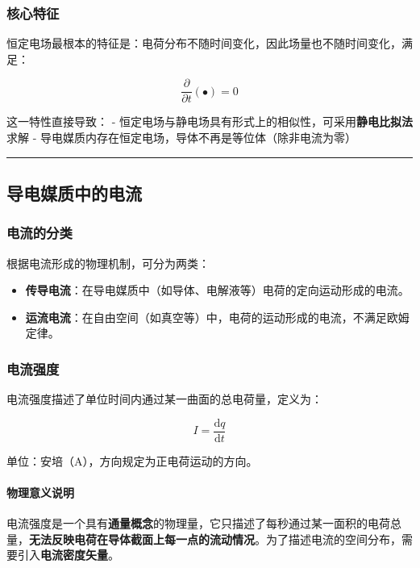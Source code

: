\subsubsection{核心特征}
恒定电场最根本的特征是：电荷分布不随时间变化，因此场量也不随时间变化，满足：
\begin{formulaBox}
\[
\frac{\partial}{\partial t}(\bullet) = 0
\]
\end{formulaBox}

\noindent 这一特性直接导致：
- 恒定电场与静电场具有形式上的相似性，可采用\textbf{静电比拟法}求解
- 导电媒质内存在恒定电场，导体不再是等位体（除非电流为零）

\vspace{0.8cm}\hrule\vspace{0.8cm}

\subsection{导电媒质中的电流}
\subsubsection{电流的分类}
根据电流形成的物理机制，可分为两类：
\begin{itemize}
    \item \textbf{传导电流}：在导电媒质中（如导体、电解液等）电荷的定向运动形成的电流。
    \item \textbf{运流电流}：在自由空间（如真空等）中，电荷的运动形成的电流，不满足欧姆定律。
\end{itemize}

\subsubsection{电流强度}
电流强度描述了单位时间内通过某一曲面的总电荷量，定义为：
\begin{formulaBox}
\[
I = \frac{\mathrm{d} q}{\mathrm{d} t}
\]
\end{formulaBox}
单位：安培（$\mathrm{A}$），方向规定为正电荷运动的方向。

\paragraph{物理意义说明}
电流强度是一个具有\textbf{通量概念}的物理量，它只描述了每秒通过某一面积的电荷总量，\textbf{无法反映电荷在导体截面上每一点的流动情况}。为了描述电流的空间分布，需要引入\textbf{电流密度矢量}。

